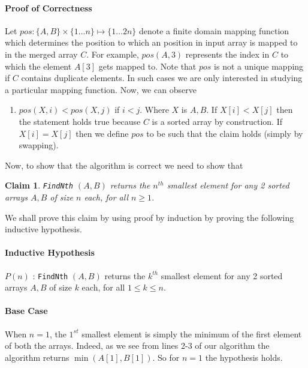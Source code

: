 \documentclass[answers]{exam}
\newtheorem{claim}{Claim}
\begin{document}
\begin{questions}
\begin{solution}
\paragraph{Proof of Correctness}
Let $pos : \{A, B\} \times \{1 \ldots n\} \mapsto \{1 \ldots 2n\}$ denote a finite domain mapping function which determines the position to which an position in input array is mapped to in the merged array $C$. For example, $pos(A, 3)$ represents the index in $C$ to which the element $A[3]$ gets mapped to. Note that $pos$ is not a unique mapping if $C$ contains duplicate elements. In such cases we are only interested in studying a particular mapping function. Now, we can observe
\begin{enumerate}
    \item $pos (X, i) < pos (X, j)$ if $i < j$. Where $X$ is $A,B$. If $X[i] < X[j]$ then the statement holds true because $C$ is a sorted array by construction. If $X[i] = X[j]$ then we define $pos$ to be such that the claim holds (simply by swapping).
\end{enumerate}

Now, to show that the algorithm is correct we need to show that
\begin{claim}
\texttt{FindNth} $(A,B)$ returns the $n^{th}$ smallest element for any 2 sorted arrays $A,B$ of size $n$ each, for all $n \geq 1$.
\end{claim}

We shall prove this claim by using proof by induction by proving the following inductive hypothesis.
\paragraph{Inductive Hypothesis} $P(n)$ : \texttt{FindNth} $(A,B)$ returns the $k^{th}$ smallest element for any 2 sorted arrays $A,B$ of size $k$ each, for all $1 \leq k \leq n$.

\paragraph{Base Case} When $n=1$, the $1^{st}$ smallest element is simply the minimum of the first element of both the arrays. Indeed, as we see from lines 2-3 of our algorithm the algorithm returns $\min (A[1], B[1])$. So for $n=1$ the hypothesis holds.


\end{solution}
\end{questions}
\end{document}

